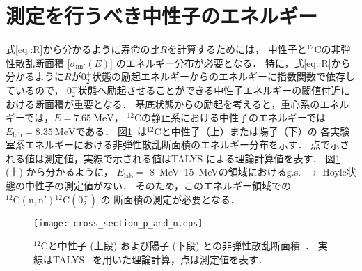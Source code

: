 \documentclass[../master]{subfiles}
\begin{document}
\section{測定を行うべき中性子のエネルギー}
式\eqref{eq::R}から分かるように寿命の比$R$を計算するためには，
中性子と${}^{12}\mathrm{C}$の非弾性散乱断面積 [$\sigma_\mathrm{nn'} (E)$] のエネルギー分布が必要となる．
特に，式\eqref{eq::R}から分かるように$R$が$0_2^+$状態の励起エネルギーからのエネルギーに指数関数で依存しているので，
$0_2^+$状態へ励起させることができる中性子エネルギーの閾値付近における断面積が重要となる．
基底状態からの励起を考えると，重心系のエネルギーでは，$E=\SI{7.65}{\mega\electronvolt}$，
${}^{12}\mathrm{C}$の静止系における中性子のエネルギーでは$E_{\text{lab}} = \SI{8.35}{\mega\electronvolt}$である．
図\ref{fig::crosssection_pres}~\cite{hotdensemedium}は${}^{12}\mathrm{C}$と中性子（上）または陽子（下）の
各実験室系エネルギーにおける非弾性散乱断面積のエネルギー分布を示す．
点で示される値は測定値，実線で示される値はTALYS による理論計算値を表す．
図\ref{fig::crosssection_pres} (上) から分かるように，
$E_{\text{lab}} =$ \SIrange{8}{15}{\mega\electronvolt}の領域におけるg.s. $\rightarrow$ Hoyle状態の中性子の測定値がない．
そのため，このエネルギー領域での ${}^{12}\mathrm{C}(\mathrm{n},\mathrm{n}'){}^{12}\mathrm{C} (0_2^+)$ の
断面積の測定が必要となる．
\begin{figure}
  \centering
  \texttt{[image: cross\_section\_p\_and\_n.eps]}
  \caption[${}^{12}\mathrm{C}$と中性子 (上段) および陽子 (下段) との非弾性散乱断面積．]
          {${}^{12}\mathrm{C}$と中性子 (上段) および陽子 (下段) との非弾性散乱断面積~\cite{hotdensemedium}．
  実線はTALYS~\cite{talys-1.0} を用いた理論計算，点は測定値を表す．}
  \label{fig::crosssection_pres}
\end{figure}
\end{document}
